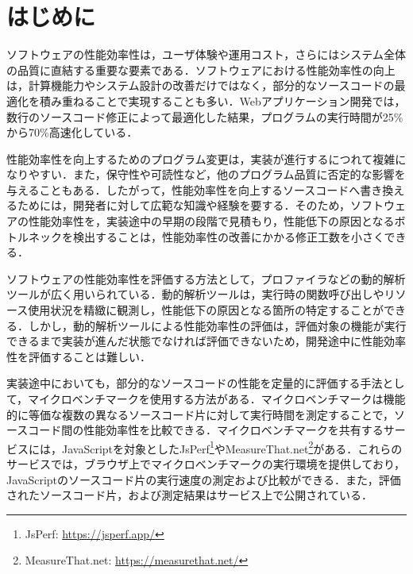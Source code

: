 \documentclass[submit,techrep,noauthor]{ipsj}
\begin{document}
\maketitle

\section{はじめに}

 ソフトウェアの性能効率性は，ユーザ体験や運用コスト，さらにはシステム全体の品質に直結する重要な要素である\cite{performance1}\cite{performance2}\cite{negative}．ソフトウェアにおける性能効率性の向上は，計算機能力やシステム設計の改善だけではなく，部分的なソースコードの最適化を積み重ねることで実現することも多い．Webアプリケーション開発では，数行のソースコード修正によって最適化した結果，プログラムの実行時間が25\%から70\%高速化している\cite{jsRefac}．

性能効率性を向上するためのプログラム変更は，実装が進行するにつれて複雑になりやすい\cite{complicate}．また，保守性や可読性など，他のプログラム品質に否定的な影響を与えることもある\cite{negative}．したがって，性能効率性を向上するソースコードへ書き換えるためには，開発者に対して広範な知識や経験を要する．そのため，ソフトウェアの性能効率性を，実装途中の早期の段階で見積もり，性能低下の原因となるボトルネックを検出することは，性能効率性の改善にかかる修正工数を小さくできる．

ソフトウェアの性能効率性を評価する方法として，プロファイラなどの動的解析ツールが広く用いられている．動的解析ツールは，実行時の関数呼び出しやリソース使用状況を精緻に観測し，性能低下の原因となる箇所の特定することができる．しかし，動的解析ツールによる性能効率性の評価は，評価対象の機能が実行できるまで実装が進んだ状態でなければ評価できないため，開発途中に性能効率性を評価することは難しい．

実装途中においても，部分的なソースコードの性能を定量的に評価する手法として，マイクロベンチマークを使用する方法がある．マイクロベンチマークは機能的に等価な複数の異なるソースコード片に対して実行時間を測定することで，ソースコード間の性能効率性を比較できる．マイクロベンチマークを共有するサービスには，JavaScriptを対象としたJsPerf\footnote{JsPerf: \url{https://jsperf.app/}}やMeasureThat.net\footnote{MeasureThat.net: \url{https://measurethat.net/}}がある．これらのサービスでは，ブラウザ上でマイクロベンチマークの実行環境を提供しており，JavaScriptのソースコード片の実行速度の測定および比較ができる．また，評価されたソースコード片，および測定結果はサービス上で公開されている．
\end{document}
